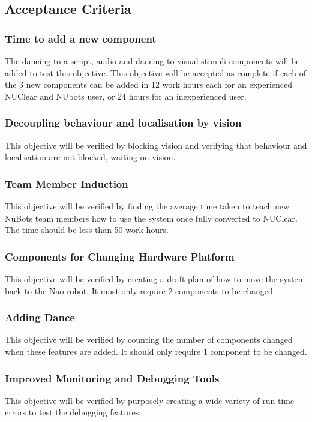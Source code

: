 \documentclass[english,12pt]{scrartcl}
\begin{document}
		\subsection {Acceptance Criteria}
			\subsubsection{Time to add a new component}
				The dancing to a script, audio and dancing to visual stimuli components will be added to test this objective.
				This objective will be accepted as complete if each of the 3 new components can be added in 12 work hours each for an experienced NUClear and NUbots user, or 24 hours for an inexperienced user.

			\subsubsection{Decoupling behaviour and localisation by vision}
				This objective will be verified by blocking vision and verifying that behaviour and localisation are not blocked, waiting on vision.

			\subsubsection{Team Member Induction}
				This objective will be verified by finding the average time taken to teach new NuBots team members how to use the system once fully converted to NUClear.
				The time should be less than 50 work hours.

			\subsubsection{Components for Changing Hardware Platform}
				This objective will be verified by creating a draft plan of how to move the system back to the Nao robot. It must only require 2 components to be changed.

			\subsubsection{Adding Dance}
				This objective will be verified by counting the number of components changed when these features are added.
				It should only require 1 component to be changed.

			\subsubsection{Improved Monitoring and Debugging Tools}
				This objective will be verified by purposely creating a wide variety of run-time errors to test the debugging features.
\end{document}
